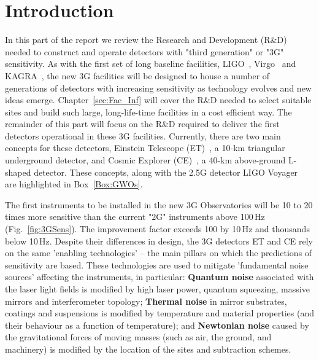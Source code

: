 \chapter{Introduction}
\label{sec:Intro}
\vspace{-1cm}
In this part of the report we review the Research and Development (R\&D) needed to construct and operate detectors with "third generation" or "3G" sensitivity. As with the first set of long baseline facilities, LIGO~\cite{AdvancedLIGO2015}, Virgo~\cite{AdvancedVirgo2015} and KAGRA~\cite{KAGRA2013}, the new 3G facilities will be designed to house a number of generations of detectors with increasing sensitivity as technology evolves and new ideas emerge. Chapter~\ref{sec:Fac_Inf} will cover the R\&D needed to select suitable sites and build such large, long-life-time facilities in a cost efficient way. The remainder of this part will focus on the R\&D required to deliver the first detectors operational in these 3G facilities.  Currently, there are two main concepts for these detectors, Einstein Telescope (ET)~\cite{ET2011}, a 10-km triangular underground detector, and Cosmic Explorer (CE)~\cite{CosmicExplorer2017}, a 40-km above-ground L-shaped detector. These concepts, along with the 2.5G detector LIGO Voyager~\cite{Voyager:Inst,VoyagerDCC2018} are highlighted in Box~\ref{Box:GWOs}.

The first instruments to be installed in the new 3G Observatories will be 10 to 20 times more sensitive than the current 
"2G" instruments above 100\,Hz (Fig.~\ref{fig:3GSens}).  The improvement factor exceeds 100 by 10\,Hz and thousands below 10\,Hz. Despite their differences in design, the 3G detectors ET and CE rely on the same 'enabling technologies' -- the main pillars on which the predictions of sensitivity are based. These technologies are used to mitigate 'fundamental noise sources' affecting the instruments, in particular: \textbf{Quantum noise} associated with the laser light fields is modified by high laser power, quantum squeezing, massive mirrors and interferometer topology; \textbf{Thermal noise} in mirror substrates, coatings and suspensions is modified by temperature and material properties (and their behaviour as a function of temperature); and \textbf{Newtonian noise} caused by the gravitational forces of moving masses (such as air, the ground, and machinery) is modified by the location of the sites and subtraction schemes. 
   

